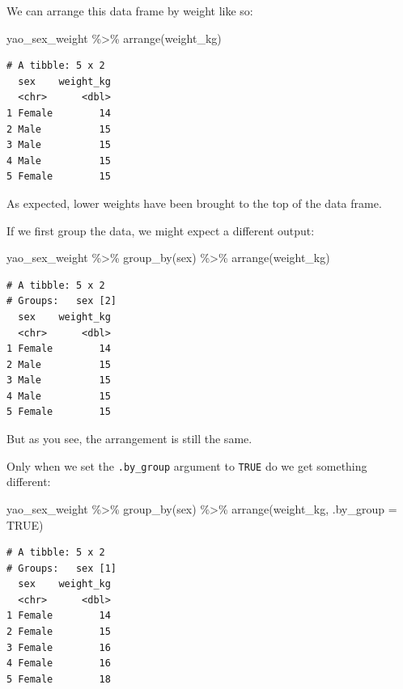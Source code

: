 \documentclass[
  letterpaper,
  DIV=11,
  numbers=noendperiod]{scrreprt}
\newenvironment{Shaded}{\begin{snugshade}}{\end{snugshade}}
\newcommand{\AttributeTok}[1]{\textcolor[rgb]{0.40,0.45,0.13}{#1}}
\newcommand{\ConstantTok}[1]{\textcolor[rgb]{0.56,0.35,0.01}{#1}}
\newcommand{\FunctionTok}[1]{\textcolor[rgb]{0.28,0.35,0.67}{#1}}
\newcommand{\NormalTok}[1]{\textcolor[rgb]{0.00,0.23,0.31}{#1}}
\newcommand{\SpecialCharTok}[1]{\textcolor[rgb]{0.37,0.37,0.37}{#1}}
\begin{document}
We can arrange this data frame by weight like so:

\begin{Shaded}
\begin{Highlighting}[]
\NormalTok{yao\_sex\_weight }\SpecialCharTok{\%\textgreater{}\%} 
  \FunctionTok{arrange}\NormalTok{(weight\_kg)}
\end{Highlighting}
\end{Shaded}

\begin{verbatim}
# A tibble: 5 x 2
  sex    weight_kg
  <chr>      <dbl>
1 Female        14
2 Male          15
3 Male          15
4 Male          15
5 Female        15
\end{verbatim}

As expected, lower weights have been brought to the top of the data
frame.

If we first group the data, we might expect a different output:

\begin{Shaded}
\begin{Highlighting}[]
\NormalTok{yao\_sex\_weight }\SpecialCharTok{\%\textgreater{}\%} 
  \FunctionTok{group\_by}\NormalTok{(sex) }\SpecialCharTok{\%\textgreater{}\%} 
  \FunctionTok{arrange}\NormalTok{(weight\_kg)}
\end{Highlighting}
\end{Shaded}

\begin{verbatim}
# A tibble: 5 x 2
# Groups:   sex [2]
  sex    weight_kg
  <chr>      <dbl>
1 Female        14
2 Male          15
3 Male          15
4 Male          15
5 Female        15
\end{verbatim}

But as you see, the arrangement is still the same.

Only when we set the \texttt{.by\_group} argument to \texttt{TRUE} do we
get something different:

\begin{Shaded}
\begin{Highlighting}[]
\NormalTok{yao\_sex\_weight }\SpecialCharTok{\%\textgreater{}\%} 
  \FunctionTok{group\_by}\NormalTok{(sex) }\SpecialCharTok{\%\textgreater{}\%} 
  \FunctionTok{arrange}\NormalTok{(weight\_kg, }\AttributeTok{.by\_group =} \ConstantTok{TRUE}\NormalTok{)}
\end{Highlighting}
\end{Shaded}

\begin{verbatim}
# A tibble: 5 x 2
# Groups:   sex [1]
  sex    weight_kg
  <chr>      <dbl>
1 Female        14
2 Female        15
3 Female        16
4 Female        16
5 Female        18
\end{verbatim}
\end{document}
